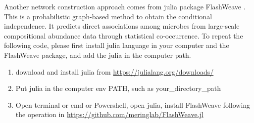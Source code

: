 \documentclass[
]{book}
\newenvironment{Shaded}{\begin{snugshade}}{\end{snugshade}}
\newcommand{\AttributeTok}[1]{\textcolor[rgb]{0.77,0.63,0.00}{#1}}
\newcommand{\CommentTok}[1]{\textcolor[rgb]{0.56,0.35,0.01}{\textit{#1}}}
\newcommand{\ConstantTok}[1]{\textcolor[rgb]{0.00,0.00,0.00}{#1}}
\newcommand{\FloatTok}[1]{\textcolor[rgb]{0.00,0.00,0.81}{#1}}
\newcommand{\FunctionTok}[1]{\textcolor[rgb]{0.00,0.00,0.00}{#1}}
\newcommand{\NormalTok}[1]{#1}
\newcommand{\OtherTok}[1]{\textcolor[rgb]{0.56,0.35,0.01}{#1}}
\newcommand{\SpecialCharTok}[1]{\textcolor[rgb]{0.00,0.00,0.00}{#1}}
\newcommand{\StringTok}[1]{\textcolor[rgb]{0.31,0.60,0.02}{#1}}
\providecommand{\tightlist}{%
  \setlength{\itemsep}{0pt}\setlength{\parskip}{0pt}}
\begin{document}
\begin{Shaded}
\end{Shaded}

Another network construction approach comes from julia package FlashWeave \citep{Tackmann_Rapid_2019}.
This is a probabilistic graph-based method to obtain the conditional independence.
It predicts direct associations among microbes from large-scale compositional abundance data through statistical co-occurrence.
To repeat the following code, please first install julia language in your computer and the FlashWeave package, and add the julia in the computer path.

\begin{enumerate}
\def\labelenumi{\arabic{enumi}.}
\tightlist
\item
  download and install julia from \url{https://julialang.org/downloads/}\\
\item
  Put julia in the computer env PATH, such as your\_directory\_path\Julia\bin  
\item
  Open terminal or cmd or Powershell, open julia, install FlashWeave following the operation in \url{https://github.com/meringlab/FlashWeave.jl}
\end{enumerate}
\end{document}
